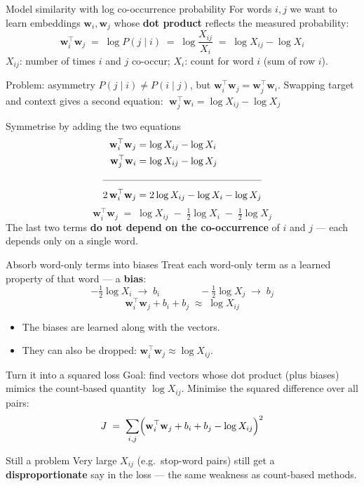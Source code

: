 \documentclass[aspectratio=169,11pt]{beamer}
\newcommand{\wv}{\mathbf{w}}
\begin{document}
\begin{frame}{Model similarity with log co-occurrence probability}
For words $i, j$ we want to learn embeddings $\wv_i, \wv_j$ whose
\textbf{dot product} reflects the measured probability:
\[
  \wv_i^\top \wv_j \;=\; \log P(j \mid i) \;=\; \log \frac{X_{ij}}{X_i}
  \;=\; \log X_{ij} - \log X_i
\]
\vspace{-1mm}
{\small $X_{ij}$: number of times $i$ and $j$ co-occur; \quad $X_i$: count for word $i$ (sum of row $i$).}
\vspace{1mm}
\begin{alertblock}{Problem: asymmetry}
$P(j \mid i) \neq P(i \mid j)$, but $\wv_i^\top\wv_j = \wv_j^\top\wv_i$.
Swapping target and context gives a second equation:
$\;\wv_j^\top \wv_i = \log X_{ij} - \log X_j$
\end{alertblock}
\end{frame}

\begin{frame}{Symmetrise by adding the two equations}
\[
\begin{aligned}
  \wv_i^\top \wv_j &= \log X_{ij} - \log X_i \\
  \wv_j^\top \wv_i &= \log X_{ij} - \log X_j \\
  \cmidrule{1-2}
  2\,\wv_i^\top \wv_j &= 2\log X_{ij} - \log X_i - \log X_j
\end{aligned}
\]
\[
  \boxed{\;\wv_i^\top \wv_j \;=\; \log X_{ij}
     \;-\; \tfrac12 \log X_i \;-\; \tfrac12 \log X_j\;}
\]
\vspace{1mm}
The last two terms \textbf{do not depend on the co-occurrence} of $i$ and $j$ ---
each depends only on a single word.
\end{frame}

\begin{frame}{Absorb word-only terms into biases}
Treat each word-only term as a learned property of that word --- a
\textbf{bias}:
\[
  -\tfrac12 \log X_i \;\longrightarrow\; b_i \qquad\qquad
  -\tfrac12 \log X_j \;\longrightarrow\; b_j
\]
\[
  \wv_i^\top \wv_j + b_i + b_j \;\approx\; \log X_{ij}
\]
\begin{itemize}
  \item The biases are learned along with the vectors.
  \item They can also be dropped:
        $\wv_i^\top\wv_j \approx \log X_{ij}$.
\end{itemize}
\end{frame}

\begin{frame}{Turn it into a squared loss}
Goal: find vectors whose dot product (plus biases) mimics the count-based
quantity $\log X_{ij}$. Minimise the squared difference over all pairs:
\[
  J \;=\; \sum_{i,j} \Bigl( \wv_i^\top \wv_j + b_i + b_j - \log X_{ij} \Bigr)^2
\]
\begin{alertblock}{Still a problem}
Very large $X_{ij}$ (e.g.\ stop-word pairs) still get a
\textbf{disproportionate} say in the loss --- the same weakness as
count-based methods.
\end{alertblock}
\end{frame}
\end{document}
